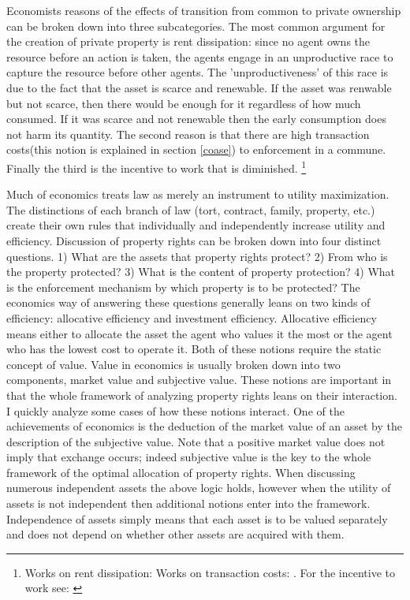 \documentclass[12pt]{report}
\numberwithin{equation}{section}
\begin{document}
Economists reasons of the effects of transition from common to private ownership can be broken down into three subcategories. The most common argument for the creation of private property is rent dissipation: since no agent owns the resource before an action is taken, the agents engage in an unproductive race to capture the resource before other agents. The 'unproductiveness' of this race is due to the fact that the asset is scarce and renewable. If the asset was renwable but not scarce, then there would be enough for it regardless of how much consumed. If it was scarce and not renewable then the early consumption does not harm its quantity. The second reason is that there are high transaction costs(this notion is explained in section \ref{coase}) to enforcement in a commune. Finally the third is the incentive to work that is diminished.  \footnote{ Works on rent dissipation:\cite{dasgupta1979economic} \cite{gordon1954economic} \cite{Cheung1970} \cite{schaefer1957some} \cite{scott1955fishery} \cite{clark1990optimal} Works on transaction costs: \cite{coase1960problem} \cite{demsetz1983structure}. For the incentive to work see: \cite{north1990} }

Much of economics treats law as merely an instrument to utility maximization. The distinctions of each branch of law (tort, contract, family, property, etc.) create their own rules that individually and independently increase utility and efficiency. Discussion of property rights can be broken down into four distinct questions. 1) What are the assets that property rights protect? 2) From who is the property protected? 3) What is the content of property protection? 4) What is the enforcement mechanism by which property is to be protected?  The economics way of answering these questions generally leans on two kinds of efficiency: allocative efficiency and investment efficiency. Allocative efficiency means either to allocate the asset the agent who values it the most or the agent who has the lowest cost to operate it. Both of these notions require the static concept of value. Value in economics is usually broken down into two components, market value and subjective value. These notions are important in that the whole framework of analyzing property rights leans on their interaction. I quickly analyze some cases of how these notions interact. One of the achievements of economics is the deduction of the market value of an asset by the description of the subjective value. Note that a positive market value does not imply that exchange occurs; indeed subjective value is the key to the whole framework of the optimal allocation of property rights. When discussing numerous independent assets the above logic holds, however when the utility of assets is not independent then additional notions enter into the framework. Independence of assets simply means that each asset is to be valued separately and does not depend on whether other assets are acquired with them.
\end{document}
